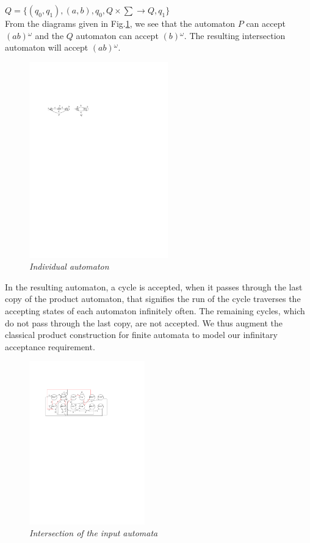 $Q = \{(q_0,q_1),(a,b),q_0, Q \times \sum \rightarrow Q,q_1\}$ \\

\noindent
From the diagrams given in Fig.\ref{fig1}, we see that the automaton $P$ can accept $(ab){^\omega}$ 
and the $Q$ automaton can accept $(b){^\omega}$. The resulting intersection automaton will accept
$(ab){^\omega}$. \\

\begin{figure}
\begin{center}
\includegraphics[width=60mm]{example_1.pdf}

\caption{{\em  Individual automaton}} \label{fig1}
\end{center}
\end{figure}
 

\noindent
 In the resulting automaton, a cycle is accepted, when it passes through the last copy
 of the product automaton, that signifies the run of the cycle traverses the accepting states of each automaton infinitely often. The remaining cycles, 
 which do not pass through the last copy, are not accepted. We thus augment the classical product construction for finite automata to model our infinitary acceptance requirement.

 
 \begin{figure}
\begin{center}
\includegraphics[width=50mm]{state_copy_transition_cycle.pdf}
\end{center}
\caption{{\em  Intersection of the input automata}}
\label{transition}
\end{figure}

